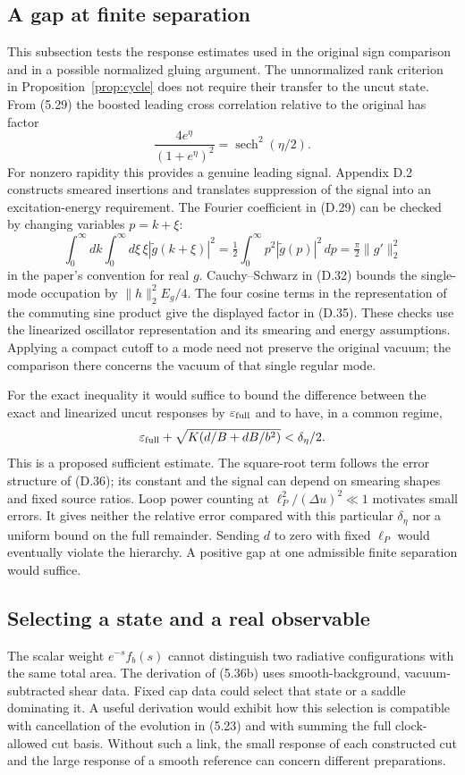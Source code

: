 \documentclass[11pt]{article}
\begin{document}
\subsection{A gap at finite separation}
This subsection tests the response estimates used in the original sign comparison and in a possible normalized gluing argument. The unnormalized rank criterion in Proposition~\ref{prop:cycle} does not require their transfer to the uncut state.
From (5.29) the boosted leading cross correlation relative to the original has factor
\[
 \frac{4e^\eta}{(1+e^\eta)^2}=\operatorname{sech}^2(\eta/2).
\]
For nonzero rapidity this provides a genuine leading signal. Appendix D.2 constructs smeared insertions and translates suppression of the signal into an excitation-energy requirement. The Fourier coefficient in (D.29) can be checked by changing variables $p=k+\xi$:
\[
 \int_0^\infty dk\int_0^\infty d\xi\,\xi|\widetilde g(k+\xi)|^2
 =\tfrac12\int_0^\infty p^2|\widetilde g(p)|^2\,dp
 =\tfrac{\pi}{2}\|g'\|_2^2
\]
in the paper's convention for real $g$. Cauchy--Schwarz in (D.32) bounds the single-mode occupation by $\|h\|_2^2 E_g/4$. The four cosine terms in the representation of the commuting sine product give the displayed factor in (D.35). These checks use the linearized oscillator representation and its smearing and energy assumptions. Applying a compact cutoff to a mode need not preserve the original vacuum; the comparison there concerns the vacuum of that single regular mode.

For the exact inequality it would suffice to bound the difference between the exact and linearized uncut responses by $\varepsilon_{\rm full}$ and to have, in a common regime,
\[
 \varepsilon_{\rm full}+\sqrt{K(d/B+dB/b^2)}<\delta_\eta/2 .
\]
This is a proposed sufficient estimate. The square-root term follows the error structure of (D.36); its constant and the signal can depend on smearing shapes and fixed source ratios. Loop power counting at $\ell_P^2/(\Delta u)^2\ll1$ motivates small errors. It gives neither the relative error compared with this particular $\delta_\eta$ nor a uniform bound on the full remainder. Sending $d$ to zero with fixed $\ell_P$ would eventually violate the hierarchy. A positive gap at one admissible finite separation would suffice.

\subsection{Selecting a state and a real observable}
The scalar weight $e^{-s}f_b(s)$ cannot distinguish two radiative configurations with the same total area. The derivation of (5.36b) uses smooth-background, vacuum-subtracted shear data. Fixed cap data could select that state or a saddle dominating it. A useful derivation would exhibit how this selection is compatible with cancellation of the evolution in (5.23) and with summing the full clock-allowed cut basis. Without such a link, the small response of each constructed cut and the large response of a smooth reference can concern different preparations.
\end{document}
